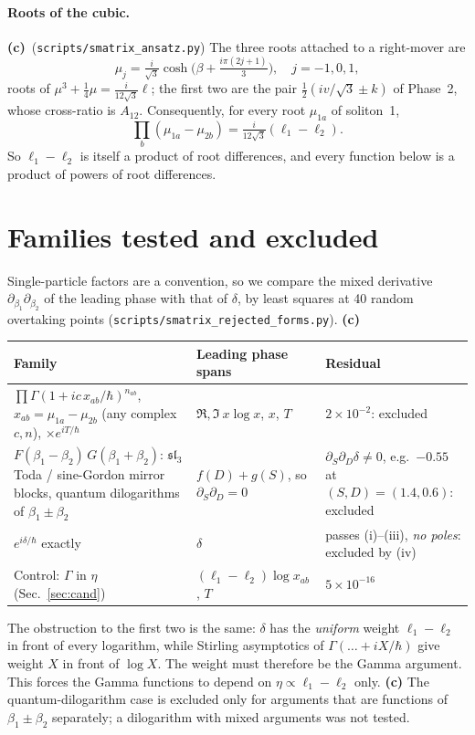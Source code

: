 \documentclass[11pt,a4paper]{article}
\newcommand{\Lc}{\textsf{\textbf{(c)}}}
\newcommand{\script}[1]{\texttt{scripts/#1}}
\theoremstyle{remark}\newtheorem{remark}[proposition]{Remark}
\begin{document}
\paragraph{Roots of the cubic.} \Lc\ (\script{smatrix\_ansatz.py}) The three roots attached to a right-mover are
\[
\mu_j=\tfrac{i}{\sqrt3}\cosh\!\big(\beta+\tfrac{i\pi(2j+1)}3\big),\quad j=-1,0,1,
\]
roots of $\mu^3+\tfrac14\mu=\tfrac{i}{12\sqrt3}\ell$; the first two are the pair $\tfrac12(iv/\sqrt3\pm k)$ of Phase~2, whose cross-ratio is $A_{12}$. Consequently, for every root $\mu_{1a}$ of soliton~1,
\begin{equation}\label{eq:prod}
\prod_{b}(\mu_{1a}-\mu_{2b})=\tfrac{i}{12\sqrt3}(\ell_1-\ell_2).
\end{equation}
So $\ell_1-\ell_2$ is itself a product of root differences, and every function below is a product of powers of root differences.

\section{Families tested and excluded}\label{sec:excl}
Single-particle factors are a convention, so we compare the mixed derivative $\partial_{\beta_1}\partial_{\beta_2}$ of the leading phase with that of $\delta$, by least squares at 40 random overtaking points (\script{smatrix\_rejected\_forms.py}). \Lc
\begin{center}\small
\begin{tabular}{@{}p{6.3cm}p{5.4cm}p{2.6cm}@{}}\toprule
Family & Leading phase spans & Residual\\\midrule
$\prod\Gamma(1+ic\,x_{ab}/\hbar)^{n_{ab}}$, $x_{ab}=\mu_{1a}-\mu_{2b}$ (any complex $c,n$), $\times e^{iT/\hbar}$ & $\Re,\Im\ x\log x$, $x$, $T$ & $2\times10^{-2}$: excluded\\
$F(\beta_1-\beta_2)\,G(\beta_1+\beta_2)$: $\mathfrak{sl}_3$ Toda / sine-Gordon mirror blocks, quantum dilogarithms of $\beta_1\pm\beta_2$ & $f(D)+g(S)$, so $\partial_S\partial_D=0$ & $\partial_S\partial_D\delta\neq0$, e.g.\ $-0.55$ at $(S,D)=(1.4,0.6)$: excluded\\
$e^{i\delta/\hbar}$ exactly & $\delta$ & passes (i)--(iii), \emph{no poles}: excluded by (iv)\\
Control: $\Gamma$ in $\eta$ (Sec.~\ref{sec:cand}) & $(\ell_1-\ell_2)\log x_{ab}$, $T$ & $5\times10^{-16}$\\
\bottomrule\end{tabular}\end{center}
The obstruction to the first two is the same: $\delta$ has the \emph{uniform} weight $\ell_1-\ell_2$ in front of every logarithm, while Stirling asymptotics of $\Gamma(\ldots+iX/\hbar)$ give weight $X$ in front of $\log X$. The weight must therefore be the Gamma argument. This forces the Gamma functions to depend on $\eta\propto\ell_1-\ell_2$ only. \Lc
The quantum-dilogarithm case is excluded only for arguments that are functions of $\beta_1\pm\beta_2$ separately; a dilogarithm with mixed arguments was not tested.
\end{document}
